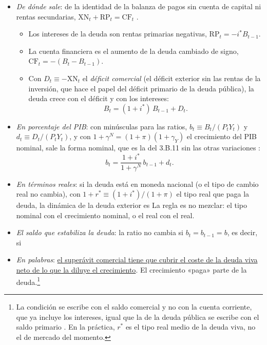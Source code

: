 \documentclass[11pt]{article}
\begin{document}
\begin{itemize}
\item \emph{De dónde sale}: de la identidad de la balanza de pagos sin cuenta de capital ni rentas secundarias, $\mathrm{XN}_t+\mathrm{RP}_t=\mathrm{CF}_t$ .
  \begin{itemize}
  \item Los intereses de la deuda son rentas primarias negativas, $\mathrm{RP}_t=-i^*B_{t-1}$.
  \item La cuenta financiera es el aumento de la deuda cambiado de signo, $\mathrm{CF}_t=-(B_t-B_{t-1})$.
  \item Con $D_t\equiv-\mathrm{XN}_t$ el \emph{déficit comercial} (el déficit exterior sin las rentas de la inversión, que hace el papel del déficit primario de la deuda pública), la deuda crece con el déficit y con los intereses:
  \begin{equation}\label{eq:deuda-nivel}
  B_t=(1+i^*)\,B_{t-1}+D_t .
  \end{equation}
  \end{itemize}
\item \emph{En porcentaje del PIB}: con minúsculas para las ratios, $b_t\equiv B_t/(P_tY_t)$ y $d_t\equiv D_t/(P_tY_t)$, y con $1+\gamma^N=(1+\pi)(1+\gamma_Y)$ el crecimiento del PIB nominal, sale la forma nominal, que es la del 3.B.11 sin las otras variaciones :
  \begin{equation}\label{eq:deuda-nominal}
  b_t=\frac{1+i^*}{1+\gamma^N}\,b_{t-1}+d_t .
  \end{equation}
\item \emph{En términos reales}: si la deuda está en moneda nacional (o el tipo de cambio real no cambia), con $1+r^*\equiv(1+i^*)/(1+\pi)$ el tipo real que paga la deuda, la dinámica de la deuda exterior es
  La regla es no mezclar: el tipo nominal con el crecimiento nominal, o el real con el real.
\item \emph{El saldo que estabiliza la deuda}: la ratio no cambia si $b_t=b_{t-1}=b$, es decir, si
\item \emph{En palabras}: \uline{el superávit comercial tiene que cubrir el coste de la deuda viva neto de lo que la diluye el crecimiento}. El crecimiento «paga» parte de la deuda.\footnote{La condición se escribe con el saldo comercial y no con la cuenta corriente, que ya incluye los intereses, igual que la de la deuda pública se escribe con el saldo primario . En la práctica, $r^*$ es el tipo real medio de la deuda viva, no el de mercado del momento.}

\end{itemize}
\end{document}
